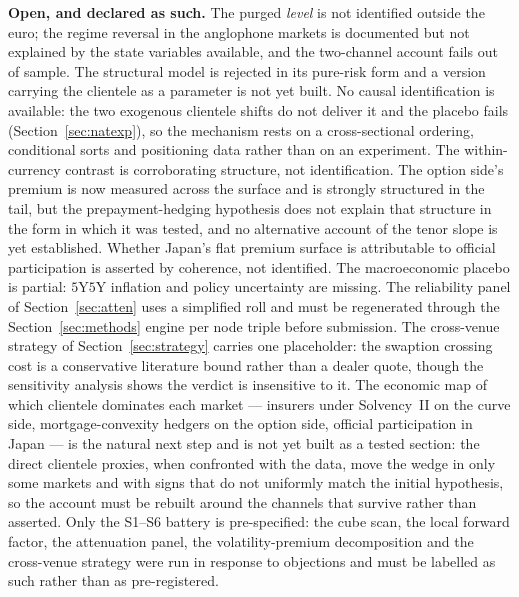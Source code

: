 \documentclass[11pt]{article}
\begin{document}
\textbf{Open, and declared as such.} The purged \emph{level} is not identified outside the euro; the
regime reversal in the anglophone markets is documented but not explained by the state variables
available, and the two-channel account fails out of sample. The structural model is rejected in its
pure-risk form and a version carrying the clientele as a parameter is not yet built. No causal identification is
available: the two exogenous clientele shifts do not deliver it and the placebo fails
(Section~\ref{sec:natexp}), so the mechanism rests on a cross-sectional ordering, conditional sorts and
positioning data rather than on an experiment. The within-currency contrast is corroborating structure,
not identification. The option side's premium is now measured across the surface and is strongly structured in the tail, but the prepayment-hedging hypothesis does not explain that structure in the form in which it was tested, and no alternative account of the tenor slope is yet established. Whether Japan's flat premium surface is attributable to official participation is asserted by coherence, not identified. The
macroeconomic placebo is partial: $5$Y$5$Y inflation and policy uncertainty are missing. The
reliability panel of Section~\ref{sec:atten} uses a simplified roll and must be regenerated through
the Section~\ref{sec:methods} engine per node triple before submission. The cross-venue strategy of
Section~\ref{sec:strategy} carries one placeholder: the swaption crossing cost is a conservative
literature bound rather than a dealer quote, though the sensitivity analysis shows the verdict is
insensitive to it. The economic map of which clientele dominates each market --- insurers under
Solvency~II on the curve side, mortgage-convexity hedgers on the option side, official participation
in Japan --- is the natural next step and is not yet built as a tested section: the direct
clientele proxies, when confronted with the data, move the wedge in only some markets and with signs
that do not uniformly match the initial hypothesis, so the account must be rebuilt around the
channels that survive rather than asserted. Only the S1--S6 battery is pre-specified: the cube
scan, the local forward factor, the attenuation panel, the volatility-premium decomposition and the
cross-venue strategy were run in response to objections and must be labelled as such rather than as
pre-registered.
\end{document}
